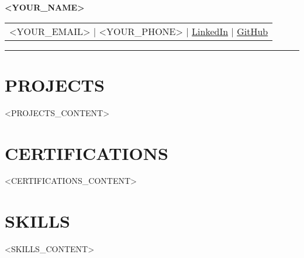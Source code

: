\documentclass[11pt]{article}
\newcommand{\resumeName}[1]{\Huge\bfseries\scshape #1}
\newcommand{\contactInfo}[4]{#1 \quad | \quad #2 \quad | \quad \href{#3}{LinkedIn} \quad | \quad \href{#4}{GitHub}}
\begin{document}
\begin{center}
    \resumeName{<YOUR_NAME>} \\[8pt]
    \small
    \begin{tabular}{c}
        \contactInfo{<YOUR_EMAIL>}{<YOUR_PHONE>}{<YOUR_LINKEDIN>}{<YOUR_GITHUB>} \\
    \end{tabular}
    \vspace{5mm}
    \hrule
\end{center}

\section{PROJECTS}
<PROJECTS_CONTENT>

\section{CERTIFICATIONS}
<CERTIFICATIONS_CONTENT>

\section{SKILLS}
\begin{itemize}
    <SKILLS_CONTENT>
\end{itemize}
\end{document}
